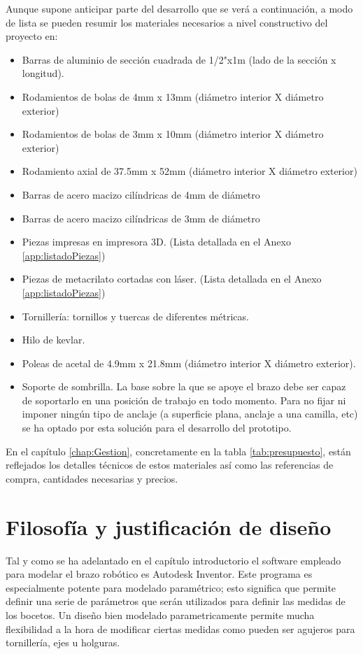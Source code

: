     Aunque supone anticipar parte del desarrollo que se verá a continuación, a modo de lista se pueden resumir los materiales necesarios a nivel constructivo del proyecto en:
    \begin{itemize}
        \item Barras de aluminio de sección cuadrada de 1/2"x1m (lado de la sección x longitud).
        \item Rodamientos de bolas de 4mm x 13mm (diámetro interior X diámetro exterior)
        \item Rodamientos de bolas de 3mm x 10mm (diámetro interior X diámetro exterior)
        \item Rodamiento axial de 37.5mm x 52mm (diámetro interior X diámetro exterior)
        \item Barras de acero macizo cilíndricas de 4mm de diámetro
        \item Barras de acero macizo cilíndricas de 3mm de diámetro
        \item Piezas impresas en impresora 3D. (Lista detallada en el Anexo \ref{app:listadoPiezas})
        \item Piezas de metacrilato cortadas con láser. (Lista detallada en el Anexo \ref{app:listadoPiezas})
        \item Tornillería: tornillos y tuercas de diferentes métricas.
        \item Hilo de kevlar.
        \item Poleas de acetal de 4.9mm x 21.8mm (diámetro interior X diámetro exterior).
        \item Soporte de sombrilla. La base sobre la que se apoye el brazo debe ser capaz de soportarlo en una posición de trabajo en todo momento. Para no fijar ni imponer ningún tipo de anclaje (a superficie plana, anclaje a una camilla, etc) se ha optado por esta solución para el desarrollo del prototipo.
    \end{itemize}

    En el capítulo \ref{chap:Gestion}, concretamente en la tabla \ref{tab:presupuesto}, están reflejados los detalles técnicos de estos materiales así como las referencias de compra, cantidades necesarias y precios.
 
\section{Filosofía y justificación de diseño} \label{sec:Mecanica:filosofia_diseno}

    Tal y como se ha adelantado en el capítulo introductorio el software empleado para modelar el brazo robótico es Autodesk Inventor. Este programa es especialmente potente para modelado paramétrico; esto significa que permite definir una serie de parámetros que serán utilizados para definir las medidas de los bocetos. Un diseño bien modelado parametricamente permite mucha flexibilidad a la hora de modificar ciertas medidas como pueden ser agujeros para tornillería, ejes u holguras.
    \\

